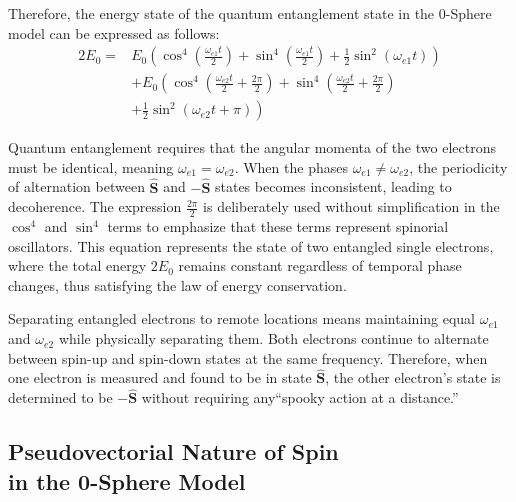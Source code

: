 \documentclass[%
 reprint,
 amsmath,amssymb,
 aps,
]{revtex4-1}
\numberwithin{equation}{section}%
\begin{document}
Therefore, the energy state of the quantum entanglement state in the 0-Sphere model can be expressed as follows:
\begin{equation}
\label{eq:2E0}
\begin{split}
2E_0 = & E_0\left(\cos^4\left(\frac{\omega_{e1} t}{2}\right) + \sin^4\left(\frac{\omega_{e1} t}{2}\right) + \frac{1}{2}\sin^2(\omega_{e1} t)\right) \\
       & + E_0\left(\cos^4\left(\frac{\omega_{e2} t}{2} + \frac{2\pi}{2} \right) + \sin^4\left(\frac{\omega_{e2} t}{2} + \frac{2\pi}{2} \right) \right. \\
       & \left. + \frac{1}{2}\sin^2(\omega_{e2} t + \pi)\right)
\end{split}
\end{equation}

Quantum entanglement requires that the angular momenta of the two electrons must be identical, meaning $\omega_{e1}=\omega_{e2}$. When the phases $\omega_{e1} \neq \omega_{e2}$, the periodicity of alternation between $\hat{\boldsymbol{S}}$ and $-\hat{\boldsymbol{S}}$ states becomes inconsistent, leading to decoherence. The expression $\frac{2\pi}{2}$ is deliberately used without simplification in the $\cos^4$ and $\sin^4$ terms to emphasize that these terms represent spinorial oscillators. This equation represents the state of two entangled single electrons, where the total energy $2E_0$ remains constant regardless of temporal phase changes, thus satisfying the law of energy conservation.

Separating entangled electrons to remote locations means maintaining equal $\omega_{e1}$ and $\omega_{e2}$ while physically separating them. Both electrons continue to alternate between spin-up and spin-down states at the same frequency. Therefore, when one electron is measured and found to be in state $\hat{\boldsymbol{S}}$, the other electron's state is determined to be $-\hat{\boldsymbol{S}}$ without requiring any``spooky action at a distance.''


\subsection{Pseudovectorial Nature of Spin \\in the 0-Sphere Model}
\label{subsec:PseudovectorNature}
\end{document}

